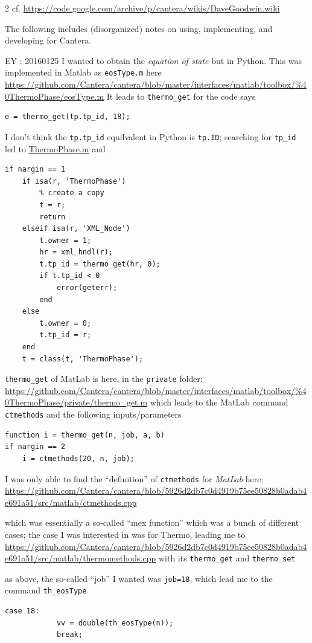 \documentclass[10pt]{amsart}
\begin{document}
\begin{multicols*}{2}
cf. \url{https://code.google.com/archive/p/cantera/wikis/DaveGoodwin.wiki}

The following includes (disorganized) notes on using, implementing, and developing for Cantera.  

EY : 20160125 I wanted to obtain the \emph{equation of state} but in Python.  This was implemented in Matlab as \verb|eosType.m| here
\url{https://github.com/Cantera/cantera/blob/master/interfaces/matlab/toolbox/%40ThermoPhase/eosType.m}
It leads to \verb|thermo_get| for the code says
\begin{lstlisting}
e = thermo_get(tp.tp_id, 18);
\end{lstlisting}
I don't think the \verb|tp.tp_id| equilvalent in Python is \verb|tp.ID|; searching for \verb|tp_id| led to \href{https://github.com/Cantera/cantera/blob/5926d2db7c0d4919b75ee50828b0adab4e691a51/interfaces/matlab/toolbox/%40ThermoPhase/ThermoPhase.m}{ThermoPhase.m} and 
\begin{lstlisting}
if nargin == 1
    if isa(r, 'ThermoPhase')
        % create a copy
        t = r;
        return
    elseif isa(r, 'XML_Node')
        t.owner = 1;
        hr = xml_hndl(r);
        t.tp_id = thermo_get(hr, 0);
        if t.tp_id < 0
            error(geterr);
        end
    else
        t.owner = 0;
        t.tp_id = r;
    end
    t = class(t, 'ThermoPhase');
\end{lstlisting}

\verb|thermo_get| of MatLab is here, in the \verb|private| folder:
\url{https://github.com/Cantera/cantera/blob/master/interfaces/matlab/toolbox/%40ThermoPhase/private/thermo_get.m}
which leads to the MatLab command \verb|ctmethods| and the following inputs/parameters
\begin{lstlisting}
function i = thermo_get(n, job, a, b)
if nargin == 2
    i = ctmethods(20, n, job);
\end{lstlisting}

I was only able to find the ``definition'' of \verb|ctmethods| for \emph{MatLab} here:
\url{https://github.com/Cantera/cantera/blob/5926d2db7c0d4919b75ee50828b0adab4e691a51/src/matlab/ctmethods.cpp}

which was essentially a so-called ``mex function'' which was a bunch of different cases; the case I was interested in was for Thermo, leading me to
\url{https://github.com/Cantera/cantera/blob/5926d2db7c0d4919b75ee50828b0adab4e691a51/src/matlab/thermomethods.cpp}
with its \verb|thermo_get| and \verb|thermo_set|

as above, the so-called ``job'' I wanted was \verb|job=18|, which lead me to the command 
\verb|th_eosType|
\begin{lstlisting}
case 18:
            vv = double(th_eosType(n));
            break;
\end{lstlisting}



\end{multicols*}
\end{document}
